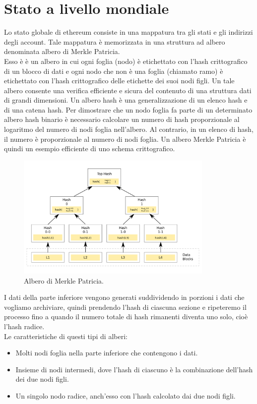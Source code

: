 \documentclass[a4paper,11pt]{report}
\begin{document}
\section{Stato a livello mondiale}
Lo stato globale di ethereum consiste in una mappatura tra gli stati e gli indirizzi degli account. Tale mappatura è memorizzata in una struttura ad albero denominata albero di Merkle Patricia.\\
Esso è  è un albero in cui ogni foglia (nodo) è etichettato con l'hash crittografico di un blocco di dati e ogni nodo che non è una foglia (chiamato ramo) è etichettato con l'hash crittografico delle etichette dei suoi nodi figli. Un tale albero consente una verifica efficiente e sicura del contenuto di una struttura dati di grandi dimensioni. Un albero hash è una generalizzazione di un elenco hash e di una catena hash.
Per dimostrare che un nodo foglia fa parte di un determinato albero hash binario è necessario calcolare un numero di hash proporzionale al logaritmo del numero di nodi foglia nell'albero. Al contrario, in un elenco di hash, il numero è proporzionale al numero di nodi foglia. Un albero Merkle Patricia è quindi un esempio efficiente di uno schema crittografico.

\begin{figure}[htbp] 
\begin{center}
\includegraphics[width=9.5cm]{img/hs.png} 
\end{center}
\caption{Albero di Merkle Patricia. \cite{albero}}
\end{figure}
\newpage
I dati della parte inferiore vengono generati suddividendo in porzioni i dati che vogliamo archiviare, quindi prendendo l'hash di ciascuna sezione e ripeteremo il processo fino a quando il numero totale di hash rimanenti diventa uno solo, cioè l'hash radice.\\
Le caratteristiche di questi tipi di alberi:
\begin{itemize}
\item Molti nodi foglia nella parte inferiore che contengono i dati.
\item Insieme di nodi intermedi, dove l'hash di ciascuno è la combinazione dell'hash dei due nodi figli.
\item Un singolo nodo radice, anch'esso con l'hash calcolato dai due nodi figli.
\end{itemize}
\end{document}
